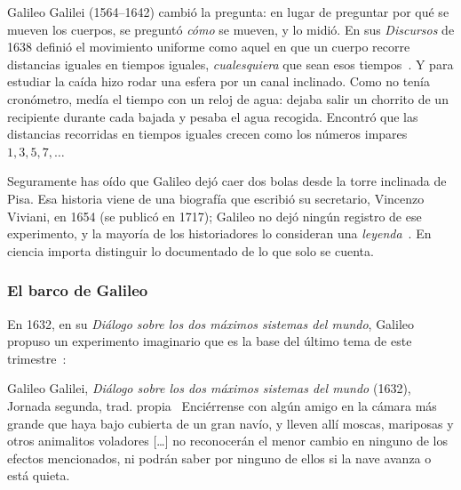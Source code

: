 \documentclass[11pt]{article}
\begin{document}
Galileo Galilei (1564--1642) cambió la pregunta: en lugar de preguntar por qué se mueven los
cuerpos, se preguntó \emph{cómo} se mueven, y lo midió. En sus \emph{Discursos} de 1638
definió el movimiento uniforme como aquel en que un cuerpo recorre distancias iguales en
tiempos iguales, \emph{cualesquiera} que sean esos tiempos~\cite{crew1914}. Y para estudiar la
caída hizo rodar una esfera por un canal inclinado. Como no tenía cronómetro, medía el tiempo
con un reloj de agua: dejaba salir un chorrito de un recipiente durante cada bajada y pesaba
el agua recogida. Encontró que las distancias recorridas en tiempos iguales crecen como los
números impares $1, 3, 5, 7, \ldots$~\cite{galileo1638}

Seguramente has oído que Galileo dejó caer dos bolas desde la torre inclinada de Pisa. Esa
historia viene de una biografía que escribió su secretario, Vincenzo Viviani, en 1654 (se
publicó en 1717); Galileo no dejó ningún registro de ese experimento, y la mayoría de los
historiadores lo consideran una \emph{leyenda}~\cite{physicsworld}. En ciencia importa
distinguir lo documentado de lo que solo se cuenta.

\subsubsection*{El barco de Galileo}

En 1632, en su \emph{Diálogo sobre los dos máximos sistemas del mundo}, Galileo propuso un
experimento imaginario que es la base del último tema de este trimestre~\cite{galileo1632}:

\begin{cita}{Galileo Galilei, \emph{Diálogo sobre los dos máximos sistemas del mundo} (1632), Jornada segunda, trad. propia~\cite{galileo1632}}
Enciérrense con algún amigo en la cámara más grande que haya bajo cubierta de un gran navío,
y lleven allí moscas, mariposas y otros animalitos voladores [\ldots] no reconocerán el menor
cambio en ninguno de los efectos mencionados, ni podrán saber por ninguno de ellos si la nave
avanza o está quieta.
\end{cita}
\end{document}
